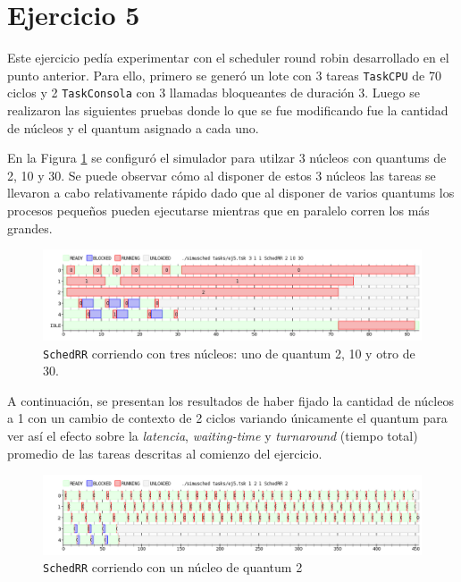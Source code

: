 \section{Ejercicio 5}

Este ejercicio pedía experimentar con el scheduler round robin desarrollado en
el punto anterior. Para ello, primero se generó un lote con 3 tareas
\texttt{TaskCPU} de 70 ciclos y 2 \texttt{TaskConsola} con 3 llamadas
bloqueantes de duración 3. Luego se realizaron las siguientes pruebas donde lo
que se fue modificando fue la cantidad de núcleos y el quantum asignado a cada
uno.

En la Figura \ref{fig:ej1_3n} se configuró el simulador para utilzar 3 núcleos
con quantums de 2, 10 y 30. Se puede observar cómo al disponer de estos 3
núcleos las tareas se llevaron a cabo relativamente rápido dado que al disponer
de varios quantums los procesos pequeños pueden ejecutarse mientras que en
paralelo corren los más grandes.

\begin{figure}[H]
	\begin{center}
		\includegraphics[width=1\columnwidth]{imagenes/ej5.png}
		\caption{\texttt{SchedRR} corriendo con tres núcleos: uno de quantum 2, 10 y otro de 30.}
		\label{fig:ej1_3n}
	\end{center}
\end{figure}

A continuación, se presentan los resultados de haber fijado la cantidad de núcleos
a 1 con un cambio de contexto de 2 ciclos variando únicamente el quantum para ver
así el efecto sobre la \emph{latencia}, \emph{waiting-time} y \emph{turnaround}
(tiempo total) promedio de las tareas descritas al comienzo del ejercicio.

\begin{figure}[H]
	\begin{center}
		\includegraphics[width=1\columnwidth]{imagenes/ej5_q2.png}
		\caption{\texttt{SchedRR} corriendo con un núcleo de quantum 2}
	\end{center}
\end{figure}

